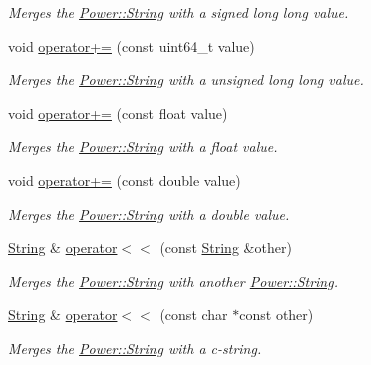 \begin{DoxyCompactItemize}
\begin{DoxyCompactList}\small\item\em Merges the \hyperlink{class_power_1_1_string}{Power\+::\+String} with a signed long long value. \end{DoxyCompactList}\item 
void \hyperlink{class_power_1_1_string_a9ccf03d5cef8d756d82c7b198e65392d}{operator+=} (const uint64\+\_\+t value)
\begin{DoxyCompactList}\small\item\em Merges the \hyperlink{class_power_1_1_string}{Power\+::\+String} with a unsigned long long value. \end{DoxyCompactList}\item 
void \hyperlink{class_power_1_1_string_a9ac2eb1de5bf6a9232e85abbcb4c9bf2}{operator+=} (const float value)
\begin{DoxyCompactList}\small\item\em Merges the \hyperlink{class_power_1_1_string}{Power\+::\+String} with a float value. \end{DoxyCompactList}\item 
void \hyperlink{class_power_1_1_string_a8689efc9a824d938249a78f02918e57d}{operator+=} (const double value)
\begin{DoxyCompactList}\small\item\em Merges the \hyperlink{class_power_1_1_string}{Power\+::\+String} with a double value. \end{DoxyCompactList}\item 
\hyperlink{class_power_1_1_string}{String} \& \hyperlink{class_power_1_1_string_a0e79c36bc1ac080cdc9bbe491cea5b32}{operator$<$$<$} (const \hyperlink{class_power_1_1_string}{String} \&other)
\begin{DoxyCompactList}\small\item\em Merges the \hyperlink{class_power_1_1_string}{Power\+::\+String} with another \hyperlink{class_power_1_1_string}{Power\+::\+String}. \end{DoxyCompactList}\item 
\hyperlink{class_power_1_1_string}{String} \& \hyperlink{class_power_1_1_string_a736113857946d87afa440b5f7c758087}{operator$<$$<$} (const char $\ast$const other)
\begin{DoxyCompactList}\small\item\em Merges the \hyperlink{class_power_1_1_string}{Power\+::\+String} with a c-\/string. \end{DoxyCompactList}\item 

\end{DoxyCompactItemize}
